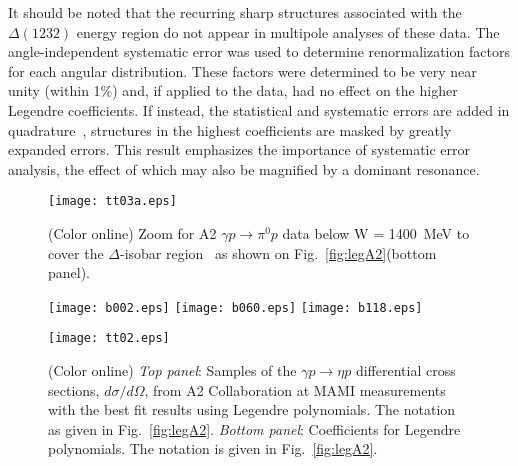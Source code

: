 \documentclass[prc,reprint,onecolumn,amsmath,amssymb,superscriptaddress]{revtex4-1}
\begin{document}
It should be noted that the recurring sharp structures associated with
the $\Delta (1232)$ energy region do not appear in multipole analyses
of these data. The angle-independent systematic error was used to determine
renormalization factors for each angular distribution. These factors were
determined to be very near unity (within 1\%) and, if applied to the
data, had no effect on the higher Legendre coefficients. If instead,
the statistical and systematic errors are added in quadrature~\cite{Beck},
structures in the highest coefficients are masked by greatly expanded errors. 
This result emphasizes the importance of systematic error analysis, the 
effect of which may also be magnified by a dominant resonance.
\begin{figure*}[htb!]
        \texttt{[image: tt03a.eps]}

        \caption {(Color online) Zoom for A2 $\gamma p\to\pi^0p$
                data below W = 1400~MeV to cover the $\Delta$-isobar
                region~\protect\cite{A2} as shown on
                Fig.~\protect\ref{fig:legA2}(bottom panel).}
                \label{fig:legA2b}
\end{figure*}

\begin{figure*}[htb!]
\begin{center}
        \texttt{[image: b002.eps]}
        \texttt{[image: b060.eps]}
        \texttt{[image: b118.eps]}
\end{center}
\begin{center}
        \texttt{[image: tt02.eps]}
\end{center}

        \caption {(Color online)
                \textit{Top panel}: Samples of the $\gamma p\to\eta p$
                differential cross sections, $d\sigma/d\Omega$, from 
		A2 Collaboration
                at MAMI measurements~\protect\cite{CBC} with the
                best fit results using Legendre polynomials. The 
		notation as given
                in Fig.~\protect\ref{fig:legA2}.
                \textit{Bottom panel}: Coefficients for Legendre
                polynomials.  The notation is given in
                Fig.~\protect\ref{fig:legA2}.} \label{fig:legA2a}
\end{figure*}
\end{document}
